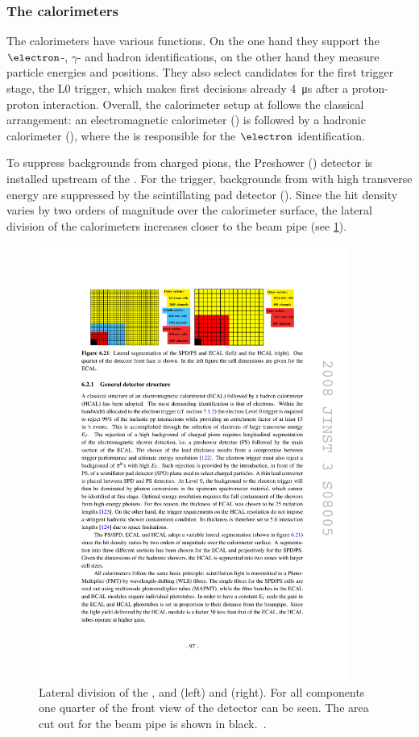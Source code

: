 \subsubsection*{The calorimeters}
\label{sec:calorimeters}

The calorimeters have various functions.
On the one hand they support the $\electron$-, $\gamma$- and hadron identifications, on the other hand they measure particle energies and positions.
They also select candidates for the first trigger stage, the L0 trigger, which makes first decisions already \SI{4}{\micro\second} after a proton-proton interaction.
Overall, the calorimeter setup at \lhcb follows the classical arrangement:
an electromagnetic calorimeter (\ecal) is followed by a hadronic calorimeter (\hcal), where the \ecal is \eg responsible for the $\electron$ identification.

To suppress backgrounds from charged pions, the Preshower (\presh) detector is installed upstream of the \ecal.
For the trigger, backgrounds from \piz with high transverse energy \et are suppressed by the scintillating pad detector (\spd).
Since the hit density varies by two orders of magnitude over the calorimeter surface, the lateral division of the calorimeters increases closer to the beam pipe (see \cref{fig:calorimeter}).
\begin{figure}[tbp]
    \centering
    \includegraphics[width=0.9\textwidth]{05lhcb/figs/calorimeter.pdf}
    \caption{Lateral division of the \presh, \spd and \ecal (left) and \hcal (right).
    For all components one quarter of the front view of the detector can be seen.
    The area cut out for the beam pipe is shown in black.~\cite{Alves:2008zz}.}
    \label{fig:calorimeter}
\end{figure}

